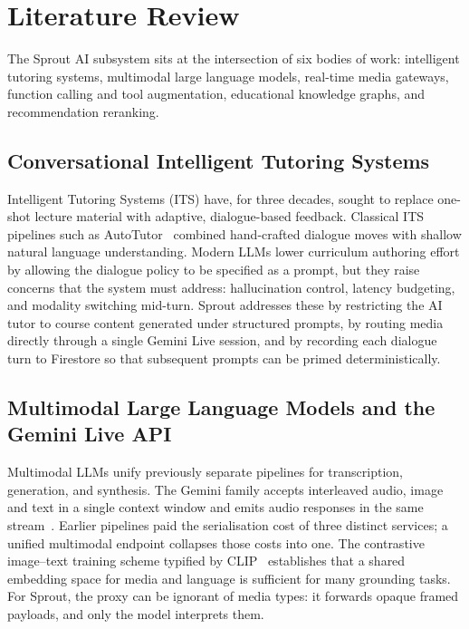 \chapter{Literature Review}
\label{ch:litreview}

The Sprout AI subsystem sits at the intersection of six bodies of work: intelligent tutoring systems, multimodal large language models, real-time media gateways, function calling and tool augmentation, educational knowledge graphs, and recommendation reranking.

\section{Conversational Intelligent Tutoring Systems}
\label{sec:lit-its}

Intelligent Tutoring Systems (ITS) have, for three decades, sought to replace one-shot lecture material with adaptive, dialogue-based feedback. Classical ITS pipelines such as AutoTutor~\cite{graesser2005autotutor} combined hand-crafted dialogue moves with shallow natural language understanding. Modern LLMs lower curriculum authoring effort by allowing the dialogue policy to be specified as a prompt, but they raise concerns that the system must address: hallucination control, latency budgeting, and modality switching mid-turn. Sprout addresses these by restricting the AI tutor to course content generated under structured prompts, by routing media directly through a single Gemini Live session, and by recording each dialogue turn to Firestore so that subsequent prompts can be primed deterministically.

\section{Multimodal Large Language Models and the Gemini Live API}
\label{sec:lit-multimodal}

Multimodal LLMs unify previously separate pipelines for transcription, generation, and synthesis. The Gemini family accepts interleaved audio, image and text in a single context window and emits audio responses in the same stream~\cite{deepmind2024gemini}. Earlier pipelines paid the serialisation cost of three distinct services; a unified multimodal endpoint collapses those costs into one. The contrastive image--text training scheme typified by CLIP~\cite{radford2021clip} establishes that a shared embedding space for media and language is sufficient for many grounding tasks. For Sprout, the proxy can be ignorant of media types: it forwards opaque framed payloads, and only the model interprets them.

